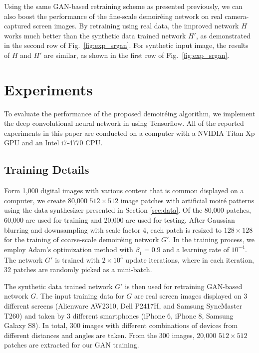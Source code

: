 \documentclass[10pt,twocolumn,letterpaper]{article}
\begin{document}
Using the same GAN-based retraining scheme as presented previously, we
can also boost the performance of the fine-scale demoir\'eing network
on real camera-captured screen images.  By retraining using real data,
the improved network $H$ works much better than the synthetic data
trained network $H'$, as demonstrated in the second row of
Fig.~\ref{fig:exp_srgan}.  For synthetic input image, the results of
$H$ and $H'$ are similar, as shown in the first row of
Fig.~\ref{fig:exp_srgan}.


\section{Experiments}
\label{sec:result}

To evaluate the performance of the proposed demoir\'eing algorithm, we
implement the deep convolutional neural network in using Tensorflow.
All of the reported experiments in this paper are conducted on a
computer with a NVIDIA Titan Xp GPU and an Intel i7-4770 CPU.

\subsection{Training Details}
\label{sec:training}

Form 1,000 digital images with various content that is common
displayed on a computer, we create 80,000 $512\times 512$ image
patches with artificial moir\'e patterns using the data synthesizer
presented in Section \ref{sec:data}.  Of the 80,000 patches, 60,000
are used for training and 20,000 are used for testing.  After Gaussian
blurring and downsampling with scale factor 4, each patch is resized
to $128\times 128$ for the training of coarse-scale demoir\'eing
network $G'$.  In the training process, we employ Adam's optimization
method \cite{kinga2015method} with $\beta_1 = 0.9$ and a learning rate
of $10^{-4}$.  The network $G'$ is trained with $2 \times 10^5$ update
iterations, where in each iteration, 32 patches are randomly picked as
a mini-batch.


The synthetic data trained network $G'$ is then used for retraining
GAN-based network $G$.  The input training data for $G$ are real
screen images displayed on 3 different screens (Alienware AW2310, Dell
P2417H, and Samsung SyncMaster T260) and taken by 3 different
smartphones (iPhone 6, iPhone 8, Samsung Galaxy S8).  In total, 300
images with different combinations of devices from different distances
and angles are taken.  From the 300 images, 20,000 $512\times 512$
patches are extracted for our GAN training. 
\end{document}

